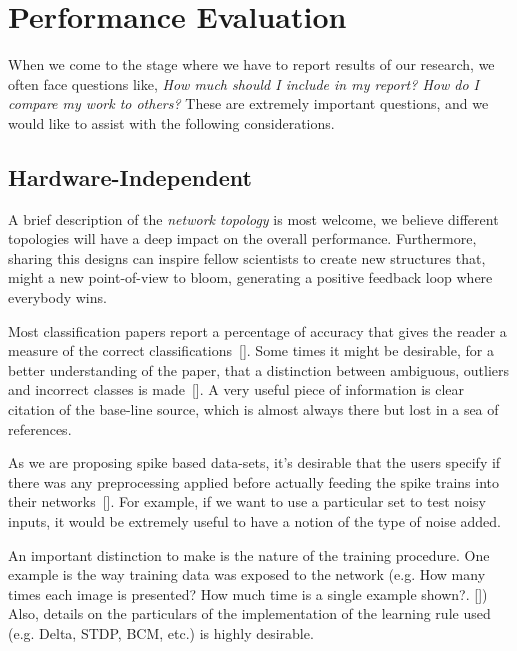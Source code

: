 \section{Performance Evaluation}
\label{sec:eval}

When we come to the stage where we have to report results of our research, we often face questions like, \emph{How much should I include in my report? How do I compare my work to others?} These are extremely important questions, and we would like to assist with the following considerations.

\subsection{Hardware-Independent}
A brief description of the \emph{network topology} is most welcome, we believe different topologies will have a deep impact on the overall performance. Furthermore, sharing this designs can inspire fellow scientists to create new structures that, might  a new point-of-view to bloom, generating a positive feedback loop where everybody wins.

Most classification papers report a percentage of accuracy that gives the reader a measure of the correct classifications~[\cite{dietterich1998approximate}]. Some times it might be desirable, for a better understanding of the paper, that a distinction between ambiguous, outliers and incorrect classes is made~[\cite{liu2002performance}]. A very useful piece of information is clear citation of the base-line source, which is almost always there but lost in a sea of references.


As we are proposing spike based data-sets, it's desirable that the users specify if there was any preprocessing applied before actually feeding the spike trains into their networks~[\cite{best-practice-nn-img}]. For example, if we want to use a particular set to test noisy inputs, it would be extremely useful to have a notion of the type of noise added.


An important distinction to make is the nature of the training procedure. One example is the way training data was exposed to the network (e.g. How many times each image is presented? How much time is a single example shown?. [\cite{unsup_leraning_diehl}]) Also, details on the particulars of the implementation of the learning rule used (e.g. Delta, STDP, BCM, etc.) is highly desirable. 

